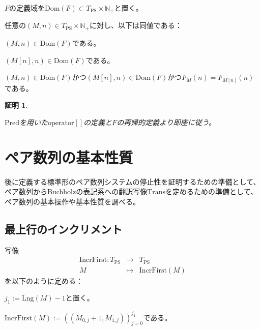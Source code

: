\documentclass[dvipdfmx,uplatex]{jsarticle}
\theoremstyle{customnonumberbreakfortheorem}
\theoremstyle{customnonumberbreakforproof}
\newtheorem{hideableproof}{証明}
\begin{document}
\(F\)の定義域を\(\textrm{Dom}(F) \subset T_{\textrm{PS}} \times \mathbb{N}_{+}\)と置く。

\begin{proposition}[\(F_M\)と基本列の関係]\label{F_Mと基本列の関係}
	任意の\((M,n) \in T_{\textrm{PS}} \times \mathbb{N}_{+}\)に対し、以下は同値である：
	\begin{penumerate}
		\item \((M,n) \in \textrm{Dom}(F)\)である。
		\item \((M[n],n) \in \textrm{Dom}(F)\)である。
		\item \((M,n) \in \textrm{Dom}(F)\)かつ\((M[n],n) \in \textrm{Dom}(F)\)かつ\(F_M(n) = F_{M[n]}(n)\)である。
	\end{penumerate}
\end{proposition}

\begin{hideableproof}
	\begin{indented}
		\item \(\textrm{Pred}\)を用いた\(\textrm{operator}[]\)の定義と\(F\)の再帰的定義より即座に従う。
	\end{indented}
\end{hideableproof}


\section{ペア数列の基本性質}

後に定義する標準形のペア数列システムの停止性を証明するための準備として、ペア数列からBuchholzの表記系への翻訳写像\(\textrm{Trans}\)を定めるための準備として、ペア数列の基本操作や基本性質を調べる。


\subsection{最上行のインクリメント}

写像
\begin{eqnarray*}
\textrm{IncrFirst} \colon T_{\textrm{PS}} & \to & T_{\textrm{PS}} \\
M & \mapsto & \textrm{IncrFirst}(M)
\end{eqnarray*}
を以下のように定める：
\begin{nenumerate}
	\item \(j_1 := \textrm{Lng}(M)-1\)と置く。
	\item \(\textrm{IncrFirst}(M) := ((M_{0,j}+1,M_{1,j}))_{j=0}^{j_1}\)である。
\end{nenumerate}
\end{document}
